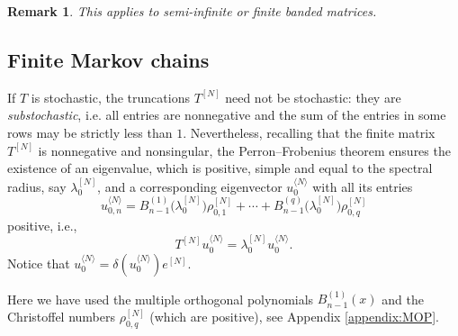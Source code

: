 \documentclass[11pt]{amsart}
\theoremstyle{plain}
\newtheorem{rem}[teo]{Remark}
\newcommand{\1}{\text{\fontseries{bx}\selectfont \textup 1}}
\begin{document}
\begin{rem}
	This applies to semi-infinite or finite banded matrices.
\end{rem}

%	

\subsection{Finite Markov chains}

If $T$ is stochastic, the truncations $T^{[N]}$ need not be stochastic: they are \emph{substochastic}, i.e. all entries are nonnegative and the sum of the entries in some rows may be strictly less than $1$. Nevertheless, recalling that the finite matrix $T^{[N]}$ is nonnegative and nonsingular, the Perron--Frobenius theorem ensures the existence of an eigenvalue, which is positive, simple and equal to the spectral radius, say $\lambda^{[N]}_0$, and a corresponding eigenvector $u_0^{\langle N\rangle}$ with all its entries
\[
u_{0,n}^{\langle N\rangle}=B_{n-1}^{(1)}\big(\lambda^{[N]}_0\big)\rho^{[N]}_{0,1} +\cdots +B_{n-1}^{(q)}\big(\lambda^{[N]}_0\big)\rho^{[N]}_{0,q}
\]
positive, i.e.,
\[
T^{[N]}u_0^{\langle N\rangle}=\lambda_0^{[N]}u_0^{\langle N\rangle}.
\]
Notice that $u_0^{\langle N\rangle}=\delta(u_0^{\langle N\rangle})e^{[N]}$.

Here we have used the multiple orthogonal polynomials $B_{n-1}^{(1)}(x)$ and the Christoffel numbers $\rho^{[N]}_{0,q}$ (which are positive), see Appendix \ref{appendix:MOP}.
\end{document}

